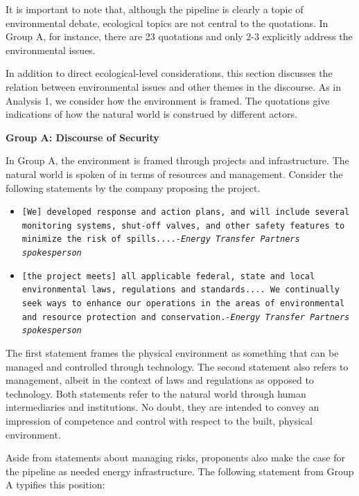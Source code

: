 It is important to note that, although the pipeline is clearly a topic of environmental debate, ecological topics are not central to the quotations. In Group A, for instance, there are 23 quotations and only 2-3 explicitly address the environmental issues. 

In addition to direct ecological-level considerations, this section discusses the relation between environmental issues and other themes in the discourse. As in Analysis 1, we consider how the environment is framed. The quotations give indications of how the natural world is construed by different actors. 

\textbf{Group A: Discourse of Security}

In Group A, the environment is framed through projects and infrastructure. The natural world is spoken of in terms of resources and management. Consider the following statements by the company proposing the project.

\begin{footnotesize}
\begin{itemize}
\item[] \texttt{[We] developed response and action plans, and will include several monitoring systems, shut-off valves, and other safety features to minimize the risk of spills....\newline \textit{-Energy Transfer Partners spokesperson}} 
\newline
\item[] \texttt{[the project meets] all applicable federal, state and local environmental laws, regulations and standards.... We continually seek ways to enhance our operations in the areas of environmental and resource protection and conservation.\newline \textit{-Energy Transfer Partners spokesperson}} 

\end{itemize}
\end{footnotesize}

The first statement frames the physical environment as something that can be managed and controlled through technology. The second statement also refers to management, albeit in the context of laws and regulations as opposed to technology. Both statements refer to the natural world through human intermediaries and institutions. No doubt, they are intended to convey an impression of competence and control with respect to the built, physical environment.

Aside from statements about managing risks, proponents also make the case for the pipeline as needed energy infrastructure. The following statement from Group A typifies this position:

